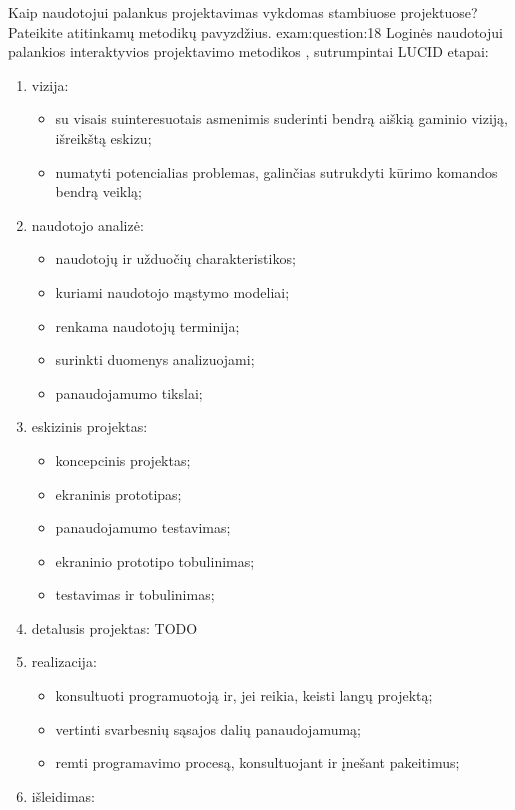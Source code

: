 \begin{question}{%
  Kaip naudotojui palankus projektavimas vykdomas stambiuose projektuose?
  Pateikite atitinkamų metodikų pavyzdžius.
  }{exam:question:18}
  Loginės naudotojui palankios interaktyvios projektavimo metodikos
  , sutrumpintai
  LUCID etapai:
  \begin{enumerate}
    \item vizija:
      \begin{itemize}
        \item su visais suinteresuotais asmenimis suderinti bendrą
          aiškią gaminio viziją, išreikštą eskizu;
        \item numatyti potencialias problemas, galinčias sutrukdyti
          kūrimo komandos bendrą veiklą;
      \end{itemize}
    \item naudotojo analizė:
      \begin{itemize}
        \item naudotojų ir užduočių charakteristikos;
        \item kuriami naudotojo mąstymo modeliai;
        \item renkama naudotojų terminija;
        \item surinkti duomenys analizuojami;
        \item panaudojamumo tikslai;
      \end{itemize}
    \item eskizinis projektas:
      \begin{itemize}
        \item koncepcinis projektas;
        \item ekraninis prototipas;
        \item panaudojamumo testavimas;
        \item ekraninio prototipo tobulinimas;
        \item testavimas ir tobulinimas;
      \end{itemize}
    \item detalusis projektas:
      TODO \cite[48]{skaidres-7}
    \item realizacija:
      \begin{itemize}
        \item konsultuoti programuotoją ir, jei reikia, keisti langų
          projektą;
        \item vertinti svarbesnių sąsajos dalių panaudojamumą;
        \item remti programavimo procesą, konsultuojant ir įnešant
          pakeitimus;
      \end{itemize}
    \item išleidimas:

\end{enumerate}
\end{question}
